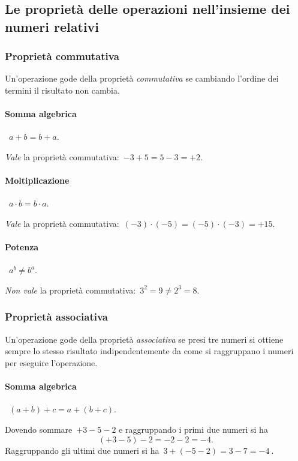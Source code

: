\ovalbox{\risolvii \ref{ese:2.22}, \ref{ese:2.23}, \ref{ese:2.24}, \ref{ese:2.25}, \ref{ese:2.26}, \ref{ese:2.27}}

\subsection{Le proprietà delle operazioni nell'insieme dei numeri relativi}
\subsubsection{Proprietà commutativa}

Un'operazione gode della proprietà \emph{commutativa} se cambiando l'ordine dei termini il risultato non cambia.
\paragraph{Somma algebrica}~$a+b=b+a$.

\emph{Vale} la proprietà commutativa:~$-3+5=5-3=+2$.

\paragraph{Moltiplicazione}~$a\cdot b=b\cdot a$.

\emph{Vale} la proprietà commutativa:~$(-3)\cdot(-5)=(-5)\cdot(-3)=+15$.

\paragraph{Potenza}~$a^b\neq b^a$.

\emph{Non vale} la proprietà commutativa:~$3^2=9\neq2^3=8$.


\subsubsection{Proprietà associativa}

Un'operazione gode della proprietà \emph{associativa} se presi tre numeri si ottiene sempre
lo stesso risultato indipendentemente da come si raggruppano i numeri per eseguire l'operazione.

\paragraph{Somma algebrica}~$(a + b)+c = a+(b+c)$.

Dovendo sommare~$+3-5-2$ e raggruppando i primi due numeri si ha
\[(+3-5)-2=-2-2=-4.\]
Raggruppando gli ultimi due numeri si ha~$3+(-5-2)=3-7 =-4~$.

